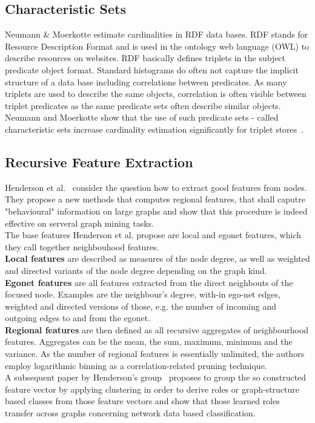 \subsection{Characteristic Sets}\label{\positionnumber}
Neumann \& Moerkotte estimate cardinalities in RDF data bases. RDF stands for Resource Description Format and is used in the ontology web language (OWL) to describe resources on websites. RDF basically defines triplets in the subject predicate object format. Standard histograms do often not capture the implicit structure of a data base including correlations between predicates. As many triplets are used to describe the same objects, correlation is often visible between triplet predicates as the same predicate sets often describe similar objects. Neumann and Moerkotte show that the use of such predicate sets - called characteristic sets increase cardinality estimation significantly for triplet stores~\cite{neumann2011characteristic}.


\subsection{Recursive Feature Extraction}\label{\positionnumber}
Henderson et al.~\cite{henderson2011s} consider the question how to extract good features from nodes. They propose a new methods that computes regional features, that shall caputre "behavioural" information on large graphs and show that this procedure is indeed effective on serveral graph mining tasks. \\
The base features Henderson et al. propose are local and egonet features, which they call together neighbouhood features. \\
\textbf{Local features} are described as measures of the node degree, as well as weighted and directed variants of the node degree depending on the graph kind. \\
\textbf{Egonet features} are all features extracted from the direct neighbouts of the focused node. Examples are the neighbour's degree, with-in ego-net edges, weighted and directed versions of those, e.g. the number of incoming and outgoing edges to and from the egonet. \\
\textbf{Regional features} are then defined as all recursive aggregates of neighbourhood features. Aggregates can be the mean, the sum, maximum, minimum and the variance. As the number of regional features is essentially unlimited, the authors employ logarithmic binning as a correlation-related pruning technique. \\
A subsequent paper by Henderson's group~\cite{henderson2012rolx} proposes to group the so constructed feature vector by applying clustering in order to derive roles or graph-structure based classes from those feature vectors and show that those learned roles transfer across graphs concerning network data based classification. \\
